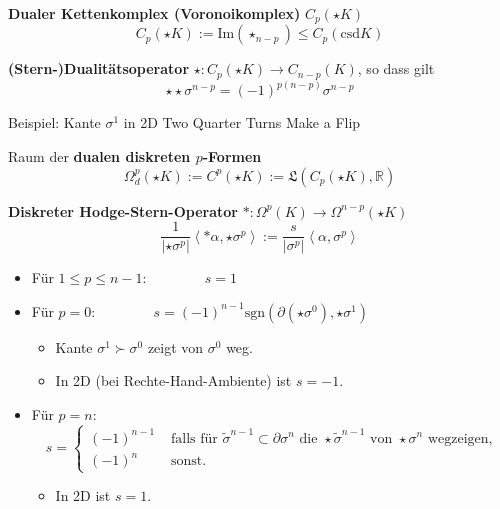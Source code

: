 \documentclass[handout]{beamer}
\newcommand{\R}{\mathds{R}}
\newcommand{\qqquad}{\qquad\qquad}
\begin{document}
  \begin{frame}
    \begin{block}{\textbf{Dualer Kettenkomplex (Voronoikomplex)} \( C_{p}(\star K) \)}
      \[ C_{p}(\star K) := \text{Im}(\star_{n-p}) \le C_{p}(\text{csd}K) \]
    \end{block}
    \pause
    \begin{block}{\textbf{(Stern-)Dualitätsoperator} \( \star: C_{p}(\star K) \longrightarrow C_{n-p}(K)\), so dass gilt}
      \[ \star\star \sigma^{n-p} = (-1)^{p(n-p)}\sigma^{n-p}\]
    \end{block}
    \pause
    \begin{block}{Beispiel: Kante \( \sigma^{1} \) in 2D}
      \glqq Two Quarter Turns Make a Flip \grqq
    \end{block}
    \pause
    \begin{block}{Raum der \textbf{dualen diskreten \( p \)-Formen} }
      \[ \Omega^{p}_{d}(\star K) := C^{p}(\star K) := \mathfrak{L}(C_{p}(\star K), \R) \]
    \end{block}
  \end{frame}

  \begin{frame}
    \begin{block}{\textbf{Diskreter Hodge-Stern-Operator} \( *: \Omega^{p}(K) \longrightarrow \Omega^{n-p}(\star K)\)}
      \pause
      \[ \frac{1}{|\star\sigma^{p}|} \left\langle *\alpha , \star\sigma^{p} \right\rangle := \frac{s}{|\sigma^{p}|} \left\langle \alpha , \sigma^{p} \right\rangle\]
      \pause
      \begin{itemize}
        \item Für \( 1 \le p \le n-1: \qqquad s = 1 \)
        \item Für \( p = 0: \qqquad s = (-1)^{n-1} \text{sgn} \left( \partial(\star\sigma^{0}), \star\sigma^{1} \right) \)
              \begin{itemize}
                \item Kante \( \sigma^{1} \succ \sigma^{0} \) zeigt von \( \sigma^{0} \) weg.
                \item In 2D (bei Rechte-Hand-Ambiente) ist \( s = -1 \).
              \end{itemize}
              \item Für \( p = n:\)      
     \[s = \begin{cases} (-1)^{n-1} & \text{ falls für } \tilde{\sigma}^{n-1} \subset \partial \sigma^{n} \text { die } \star\tilde{\sigma}^{n-1} \text{ von } \star\sigma^{n} \text{ wegzeigen,} \\
                         (-1)^{n} & \text{ sonst.}
           \end{cases}\]
                \begin{itemize}
                  \item In 2D ist \( s = 1 \).
                \end{itemize}
      \end{itemize}
    \end{block}
  \end{frame}
\end{document}
